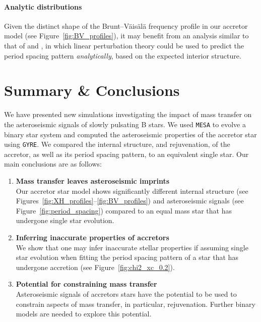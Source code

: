 \documentclass[twocolumn, twocolappendix, oneside]{aastex631}
\newcommand{\bvf}{Brunt–Väisälä frequency\xspace}
\newcommand{\mesa}{\texttt{MESA}\xspace}
\newcommand{\gyre}{\texttt{GYRE}\xspace}
\begin{document}
\paragraph{Analytic distributions} Given the distinct shape of the \bvf profile in our accretor model (see Figure~\ref{fig:BV_profiles}), it may benefit from an analysis similar to that of \citet{Miglio+2008} and \citet{Hatta+2023}, in which linear perturbation theory could be used to predict the period spacing pattern \textit{analytically}, based on the expected interior structure.

\section{Summary \& Conclusions} \label{sec:conclusion}

We have presented new simulations investigating the impact of mass transfer on the asteroseismic signals of slowly pulsating B stars. We used \mesa to evolve a binary star system and computed the asteroseismic properties of the accretor star using \gyre. We compared the internal structure, and rejuvenation, of the accretor, as well as its period spacing pattern, to an equivalent single star. Our main conclusions are as follows:

\begin{enumerate}
    \item \textbf{Mass transfer leaves asteroseismic imprints}\\Our accretor star model shows significantly different internal structure (see Figures~\ref{fig:XH_profiles}--\ref{fig:BV_profiles}) and asteroseismic signals (see Figure~\ref{fig:period_spacing}) compared to an equal mass star that has undergone single star evolution.
    \item \textbf{Inferring inaccurate properties of accretors}\\We show that one may infer inaccurate stellar properties if assuming single star evolution when fitting the period spacing pattern of a star that has undergone accretion (see Figure~\ref{fig:chi2_xc_0.2}).
    \item \textbf{Potential for constraining mass transfer}\\Asteroseismic signals of accretors stars have the potential to be used to constrain aspects of mass transfer, in particular, rejuvenation. Further binary models are needed to explore this potential.
\end{enumerate}
\end{document}
